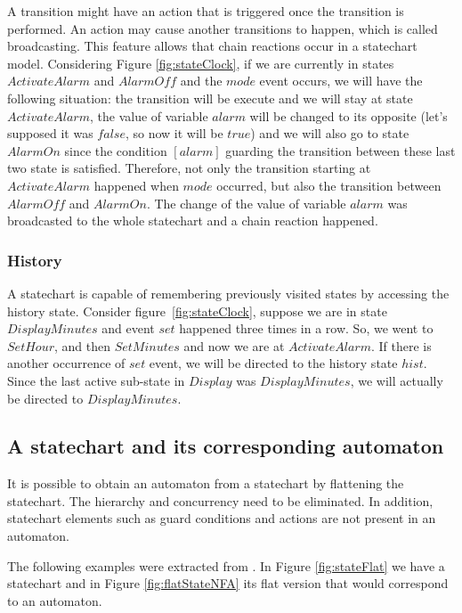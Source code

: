 A transition might have an action that is triggered once the transition is performed.  An action may cause another transitions to happen, which is called broadcasting. This feature allows that chain reactions occur in a statechart model. Considering Figure \ref{fig:stateClock}, if we are currently in states $ActivateAlarm$ and $AlarmOff$ and the $mode$ event occurs, we will have the following situation: the transition will be execute and we will stay at state $ActivateAlarm$, the value of variable $alarm$ will be changed to its opposite (let's supposed it was $false$, so now it will be $true$) and we will also go to state $AlarmOn$ since the condition $[alarm]$ guarding the transition between these last two state is satisfied. Therefore, not only the transition starting at $ActivateAlarm$ happened when $mode$ occurred, but also the transition between $AlarmOff$ and $AlarmOn$. The change of the value of variable $alarm$ was broadcasted to the whole statechart and a chain reaction happened.

\subsubsection{History}

A statechart is capable of remembering previously visited states by accessing the history state. Consider figure~\ref{fig:stateClock}, suppose we are in state $DisplayMinutes$ and event $set$ happened three times in a row. So, we went to $SetHour$, and then $SetMinutes$ and now we are at $ActivateAlarm$. If there is another occurrence of $set$ event, we will be directed to the history state $hist$. Since the last active sub-state in $Display$ was $DisplayMinutes$, we will actually be directed to $DisplayMinutes$.

\subsection{A statechart and its corresponding automaton}
\label{flattening}

It is possible to obtain an automaton from a statechart by flattening the statechart. The hierarchy and concurrency need to be eliminated. In addition, statechart elements such as guard conditions and actions are not present in an automaton. 

The following examples were extracted from \cite{harel87:semantics_statecharts}. In Figure \ref{fig:stateFlat} we have a statechart and in Figure \ref{fig:flatStateNFA} its flat version that would correspond to an automaton.

